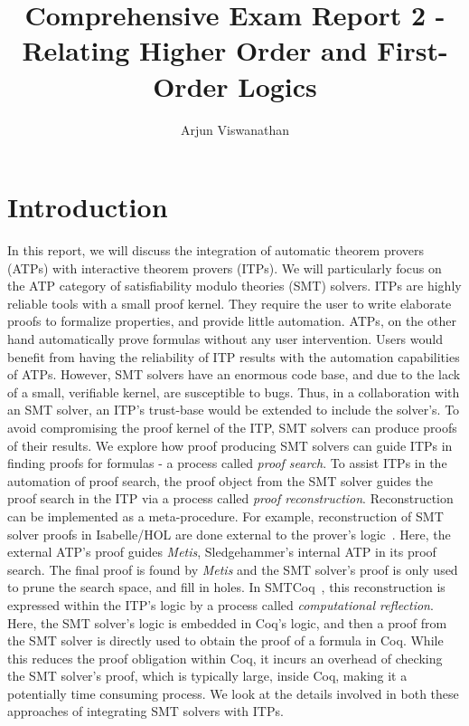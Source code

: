 \documentclass[11pt]{article}
\begin{document}
	\title{Comprehensive Exam Report 2 - Relating Higher Order and First-Order Logics}
	\author{Arjun Viswanathan}
	\date{}
	\maketitle
	
	\section{Introduction}
	\label{sec:intro}
	In this report, we will discuss the 
	integration of automatic theorem provers 
	(ATPs) with interactive theorem 
	provers (ITPs). We will particularly
	focus on the ATP category of 
	satisfiability modulo theories (SMT) 
	solvers. ITPs are highly 
	reliable tools with a small proof kernel. 
	They require the user to write elaborate 
	proofs to formalize properties, and 
	provide little automation. ATPs, on the 
	other hand automatically prove formulas
	without any user intervention.  
	Users would benefit from having 
	the reliability of ITP results 
	with the automation capabilities
	of ATPs. However, SMT solvers have an 
	enormous code base, and due to the 
	lack of a small, verifiable kernel, 
	are susceptible to bugs. Thus, in a 
	collaboration with an SMT 
	solver, an ITP's trust-base would be 
	extended to include the solver's. To 
	avoid compromising the proof kernel of 
	the ITP, SMT solvers can 
	produce proofs of their results. 
	We explore how proof producing 
	SMT solvers can guide ITPs in 
	finding proofs for formulas - 
	a process called \textit{proof 
	search}. To assist ITPs in the 
	automation
	of proof search, the proof object from 
	the SMT solver guides the proof search 
	in the ITP via a process called
	\textit{proof reconstruction}.
	Reconstruction can be implemented 
	as a meta-procedure. For example, 
	reconstruction of SMT solver proofs 
	in Isabelle/HOL are done external to 
	the prover's logic~\cite{bohme}.
	Here, the external ATP's proof guides 
	\textit{Metis}, Sledgehammer's
	internal ATP in its proof search.
	The final proof is found by 
	\textit{Metis} and the SMT solver's 
	proof is only used to prune the 
	search space, and fill in holes.
	In SMTCoq~\cite{DBLP:phd/hal/Keller13},
	this reconstruction is 
	expressed within the ITP's logic 
	by a process called 
	\textit{computational reflection}.
	Here, the SMT solver's logic is 
	embedded in Coq's logic, and then 
	a proof from the SMT solver is 
	directly used to obtain the 
	proof of a formula in Coq. 
	While this reduces the 
	proof obligation within Coq, it incurs
	an overhead of checking the SMT 
	solver's proof, which is typically 
	large, inside Coq, making it a
	potentially time consuming process. 
	We look at the details involved in both 
	these approaches of integrating 
	SMT solvers with ITPs.
	
\end{document}

